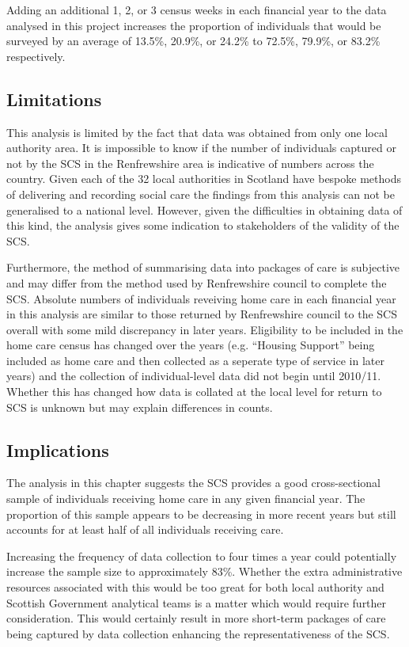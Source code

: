 \documentclass[]{article}
\begin{document}
Adding an additional 1, 2, or 3 census weeks in each financial year to
the data analysed in this project increases the proportion of
individuals that would be surveyed by an average of 13.5\%, 20.9\%, or
24.2\% to 72.5\%, 79.9\%, or 83.2\% respectively.

\subsection{Limitations}\label{subsec:renf-discuss-lim}

This analysis is limited by the fact that data was obtained from only
one local authority area. It is impossible to know if the number of
individuals captured or not by the SCS in the Renfrewshire area is
indicative of numbers across the country. Given each of the 32 local
authorities in Scotland have bespoke methods of delivering and recording
social care the findings from this analysis can not be generalised to a
national level. However, given the difficulties in obtaining data of
this kind, the analysis gives some indication to stakeholders of the
validity of the SCS.

Furthermore, the method of summarising data into packages of care is
subjective and may differ from the method used by Renfrewshire council
to complete the SCS. Absolute numbers of individuals reveiving home care
in each financial year in this analysis are similar to those returned by
Renfrewshire council to the SCS overall with some mild discrepancy in
later years. Eligibility to be included in the home care census has
changed over the years (e.g. ``Housing Support'' being included as home
care and then collected as a seperate type of service in later years)
and the collection of individual-level data did not begin until 2010/11.
Whether this has changed how data is collated at the local level for
return to SCS is unknown but may explain differences in counts.

\subsection{Implications}\label{subsec:renf-discuss-imp}

The analysis in this chapter suggests the SCS provides a good
cross-sectional sample of individuals receiving home care in any given
financial year. The proportion of this sample appears to be decreasing
in more recent years but still accounts for at least half of all
individuals receiving care.

Increasing the frequency of data collection to four times a year could
potentially increase the sample size to approximately 83\%. Whether the
extra administrative resources associated with this would be too great
for both local authority and Scottish Government analytical teams is a
matter which would require further consideration. This would certainly
result in more short-term packages of care being captured by data
collection enhancing the representativeness of the SCS.
\end{document}
